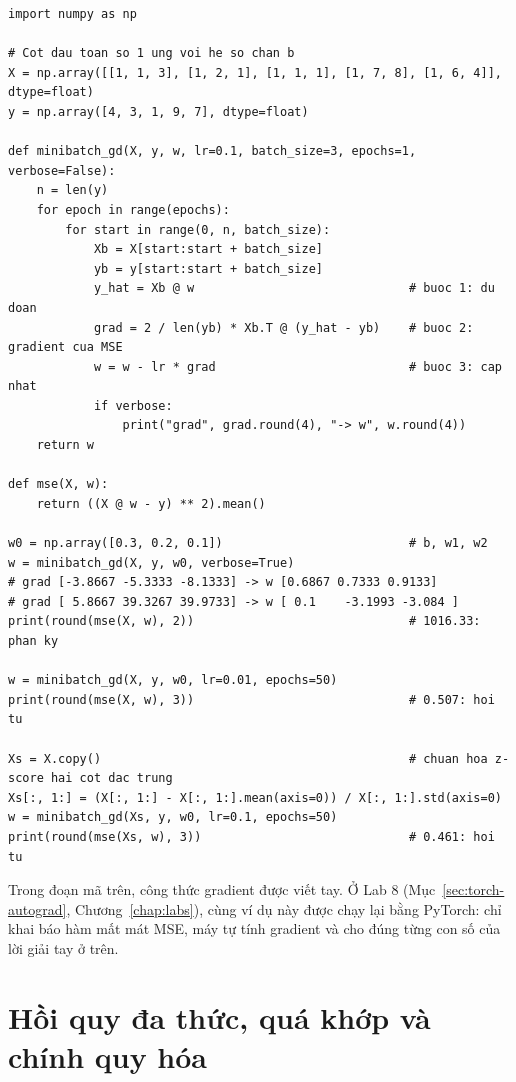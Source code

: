 \begin{lstlisting}[caption={Mini-batch Gradient Descent dạng ma trận cho hồi quy tuyến tính}]
import numpy as np

# Cot dau toan so 1 ung voi he so chan b
X = np.array([[1, 1, 3], [1, 2, 1], [1, 1, 1], [1, 7, 8], [1, 6, 4]], dtype=float)
y = np.array([4, 3, 1, 9, 7], dtype=float)

def minibatch_gd(X, y, w, lr=0.1, batch_size=3, epochs=1, verbose=False):
    n = len(y)
    for epoch in range(epochs):
        for start in range(0, n, batch_size):
            Xb = X[start:start + batch_size]
            yb = y[start:start + batch_size]
            y_hat = Xb @ w                              # buoc 1: du doan
            grad = 2 / len(yb) * Xb.T @ (y_hat - yb)    # buoc 2: gradient cua MSE
            w = w - lr * grad                           # buoc 3: cap nhat
            if verbose:
                print("grad", grad.round(4), "-> w", w.round(4))
    return w

def mse(X, w):
    return ((X @ w - y) ** 2).mean()

w0 = np.array([0.3, 0.2, 0.1])                          # b, w1, w2
w = minibatch_gd(X, y, w0, verbose=True)
# grad [-3.8667 -5.3333 -8.1333] -> w [0.6867 0.7333 0.9133]
# grad [ 5.8667 39.3267 39.9733] -> w [ 0.1    -3.1993 -3.084 ]
print(round(mse(X, w), 2))                              # 1016.33: phan ky

w = minibatch_gd(X, y, w0, lr=0.01, epochs=50)
print(round(mse(X, w), 3))                              # 0.507: hoi tu

Xs = X.copy()                                           # chuan hoa z-score hai cot dac trung
Xs[:, 1:] = (X[:, 1:] - X[:, 1:].mean(axis=0)) / X[:, 1:].std(axis=0)
w = minibatch_gd(Xs, y, w0, lr=0.1, epochs=50)
print(round(mse(Xs, w), 3))                             # 0.461: hoi tu
\end{lstlisting}

\noindent Trong đoạn mã trên, công thức gradient được viết tay. Ở Lab 8 (Mục~\ref{sec:torch-autograd}, Chương~\ref{chap:labs}), cùng ví dụ này được chạy lại bằng PyTorch: chỉ khai báo hàm mất mát MSE, máy tự tính gradient và cho đúng từng con số của lời giải tay ở trên.

\section{Hồi quy đa thức, quá khớp và chính quy hóa}

